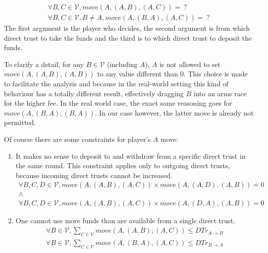   \begin{gather*}
    \forall B, C \in \mathcal{V}, move\left(A, \left(A, B\right), \left(A, C\right) \right) = \: ? \\
    \forall B, C \in \mathcal{V}, B \neq A, move\left(A, \left(B, A\right), \left(A, C\right) \right) = \: ?
  \end{gather*}
  The first argument is the player who decides, the second argument is from which direct trust to take the funds and the third
  is to which direct trust to deposit the funds.
  
  To clarify a detail, for any $B \in \mathcal{V}$ (including $A$), $A$ is not allowed to set $move\left(A, \left(A, B\right),
  \left(A, B\right) \right)$ to any value different than 0. This choice is made to facilitate the analysis and because in the
  real-world setting this kind of behaviour has a totally different result, effectively dragging $B$ into an arms race for the
  higher fee. In the real world case, the exact same reasoning goes for $move\left(A, \left(B, A\right), \left(B, A\right)
  \right)$. In our case however, the latter move is already not permitted.
  
  Of course there are some constraints for player's $A$ move:
  
  \begin{enumerate}
    \item It makes no sense to deposit to and withdraw from a specific direct trust in the same round. This constraint applies
    only to outgoing direct trusts, because incoming direct trusts cannot be increased.
    \begin{gather*}
      \forall B, C, D \in \mathcal{V}, move\left(A, \left(A, B\right), \left(A, C\right) \right) \times move\left(A, \left(A,
      D\right), \left(A, B\right) \right) = 0 \\
      \wedge \\
      \forall B, C, D \in \mathcal{V}, move\left(A, \left(A, B\right), \left(A, C\right) \right) \times move\left(A, \left(D,
      A\right), \left(A, B\right) \right) = 0
    \end{gather*}
  
    \item One cannot use more funds than are available from a single direct trust.
    \begin{gather*}
      \forall B \in \mathcal{V}, \sum\limits_{C \in \mathcal{V}} move\left(A, \left(A, B\right), \left(A, C\right) \right)
        \leq DTr_{A \rightarrow B} \\
      \forall B \in \mathcal{V}, \sum\limits_{C \in \mathcal{V}} move\left(A, \left(B, A\right), \left(A, C\right) \right)
        \leq DTr_{B \rightarrow A} \\
    \end{gather*}
  \end{enumerate}
  
